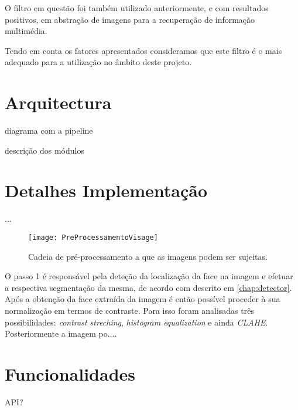 O filtro em questão foi também utilizado anteriormente, e com resultados positivos, em abstração de imagens para a recuperação de informação multimédia. 

Tendo em conta os fatores apresentados consideramos que este filtro é o mais adequado para a utilização no âmbito deste projeto.
	
\section{Arquitectura}

	diagrama com a pipeline
	
	descrição dos módulos
	
\section{Detalhes Implementação}
...

\begin{figure}[ht]
  \begin{center}
    \leavevmode
    \texttt{[image: PreProcessamentoVisage]}
    \caption{Cadeia de pré-processamento a que as imagens podem ser sujeitas.}
    \label{fig:preprocessamento}
  \end{center}
\end{figure}

O passo 1 é responsável pela deteção da localização da face na imagem e efetuar a respectiva segmentação da mesma, de acordo com descrito em \ref{chap:detector}. Após a obtenção da face extraída da imagem é então possível proceder à sua normalização em termos de contraste. Para isso foram analisadas três possibilidades: \textit{contrast streching}, \textit{histogram equalization} e ainda \textit{CLAHE}. Posteriormente a imagem po....


\section{Funcionalidades}

	API?
